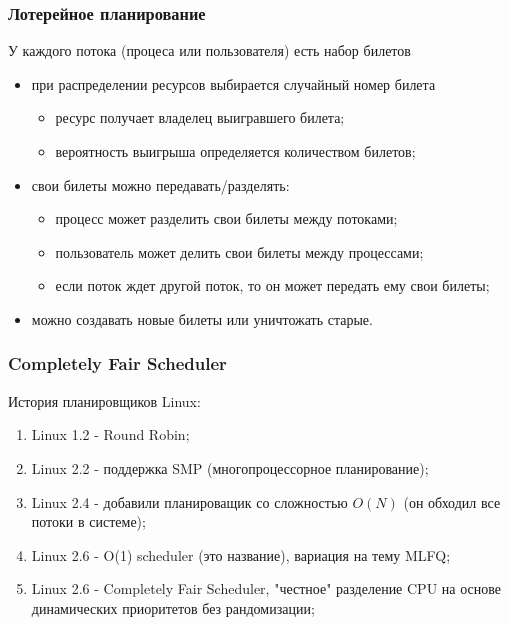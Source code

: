 \begin{frame}
\frametitle{Лотерейное планирование}

У каждого потока (процеса или пользователя) есть набор билетов
\begin{itemize}
  \item при распределении ресурсов выбирается случайный номер билета
        \begin{itemize}
          \item ресурс получает владелец выигравшего билета;
          \item вероятность выигрыша определяется количеством билетов;
        \end{itemize}
  \item свои билеты можно передавать/разделять:
        \begin{itemize}
          \item процесс может разделить свои билеты между потоками;
          \item пользователь может делить свои билеты между процессами;
          \item если поток ждет другой поток, то он может передать ему свои
                билеты;
        \end{itemize}
  \item можно создавать новые билеты или уничтожать старые.
\end{itemize}
\end{frame}

\begin{frame}
\frametitle{Completely Fair Scheduler}

История планировщиков Linux:
\begin{enumerate}
  \item Linux 1.2 - Round Robin;
  \item Linux 2.2 - поддержка SMP (многопроцессорное планирование);
  \item Linux 2.4 - добавили планироващик со сложностью $O(N)$ (он обходил все
        потоки в системе);
  \item Linux 2.6 - O(1) scheduler (это название), вариация на тему MLFQ;
  \item Linux 2.6 - Completely Fair Scheduler, "честное" разделение CPU на
        основе динамических приоритетов без рандомизации;
\end{enumerate}
\end{frame}

